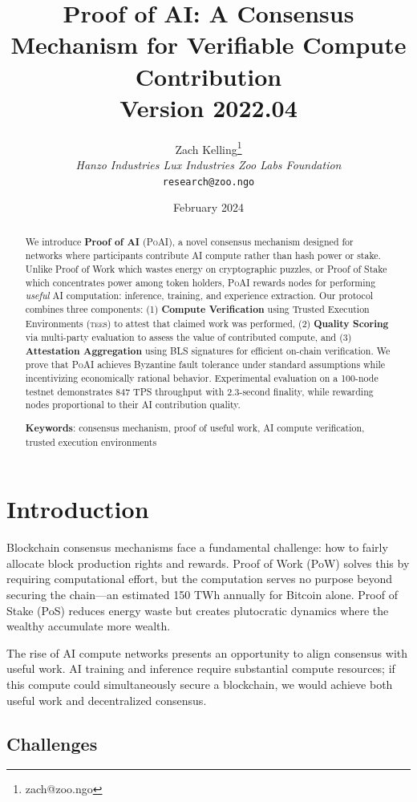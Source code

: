 \documentclass[11pt,letterpaper]{article}
\title{\textbf{Proof of AI: A Consensus Mechanism for Verifiable Compute Contribution}\\
\large Version 2022.04}
\author{
Zach Kelling\thanks{zach@zoo.ngo}\\
\textit{Hanzo Industries \quad Lux Industries \quad Zoo Labs Foundation}\\
\texttt{research@zoo.ngo}
}
\date{February 2024}
\newcommand{\PoAI}{\textsc{PoAI}}
\newcommand{\TEE}{\textsc{tee}}
\begin{document}
\zoocoverpage

\begin{abstract}
We introduce \textbf{Proof of AI} (\PoAI{}), a novel consensus mechanism designed for networks where participants contribute AI compute rather than hash power or stake. Unlike Proof of Work which wastes energy on cryptographic puzzles, or Proof of Stake which concentrates power among token holders, \PoAI{} rewards nodes for performing \emph{useful} AI computation: inference, training, and experience extraction. Our protocol combines three components: (1) \textbf{Compute Verification} using Trusted Execution Environments (\TEE{}s) to attest that claimed work was performed, (2) \textbf{Quality Scoring} via multi-party evaluation to assess the value of contributed compute, and (3) \textbf{Attestation Aggregation} using BLS signatures for efficient on-chain verification. We prove that \PoAI{} achieves Byzantine fault tolerance under standard assumptions while incentivizing economically rational behavior. Experimental evaluation on a 100-node testnet demonstrates 847 TPS throughput with 2.3-second finality, while rewarding nodes proportional to their AI contribution quality.

\textbf{Keywords}: consensus mechanism, proof of useful work, AI compute verification, trusted execution environments
\end{abstract}

\section{Introduction}

Blockchain consensus mechanisms face a fundamental challenge: how to fairly allocate block production rights and rewards. Proof of Work (PoW) solves this by requiring computational effort, but the computation serves no purpose beyond securing the chain---an estimated 150 TWh annually for Bitcoin alone. Proof of Stake (PoS) reduces energy waste but creates plutocratic dynamics where the wealthy accumulate more wealth.

The rise of AI compute networks presents an opportunity to align consensus with useful work. AI training and inference require substantial compute resources; if this compute could simultaneously secure a blockchain, we would achieve both useful work and decentralized consensus.

\subsection{Challenges}
\end{document}
